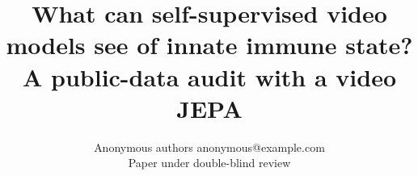 \documentclass[10pt]{article}
\title{What can self-supervised video models see of innate immune state?\\
A public-data audit with a video JEPA}
\author{\name Anonymous authors \email anonymous@example.com \\
\addr Paper under double-blind review}
\begin{document}
\maketitle




\figcoverage




\figtraining
\figbenchmarks
\figassoc




\figdesign






\appendix

\figsignalling

\figrestim

\end{document}
